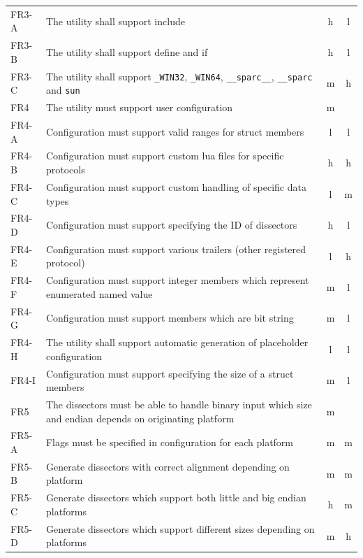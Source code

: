 \begin{table}[htbp]
{\begin{tabularx}{1.2\textwidth}{l X c c}
	FR3-A & The \gls{utility} shall support \gls{include} & \Gls{h} & \Gls{l} \\
	FR3-B & The \gls{utility} shall support \gls{define} and \gls{if} & \Gls{h} & \Gls{l} \\
	FR3-C & The \gls{utility} shall support \verb+_WIN32+, \verb+_WIN64+, \verb+__sparc__+, \verb+__sparc+ and \verb+sun+ & \Gls{m} & \Gls{h} \\
	\midrule
	FR4 & The \gls{utility} must support user configuration & \Gls{m} & \\
	FR4-A & Configuration must support valid ranges for \gls{struct} \glspl{member} & \Gls{l} & \Gls{l} \\
	FR4-B & Configuration must support custom \Gls{lua} files for specific \glspl{protocol} & \Gls{h} & \Gls{h} \\
	FR4-C & Configuration must support custom handling of specific data types & \Gls{l} & \Gls{m} \\
	FR4-D & Configuration must support specifying the ID of \glspl{dissector} & \Gls{h} & \Gls{l} \\
	FR4-E & Configuration must support various trailers (other registered \gls{protocol}) & \Gls{l} & \Gls{h} \\
	FR4-F & Configuration must support integer \glspl{member} which represent enumerated named value & \Gls{m} & \Gls{l} \\	
	FR4-G & Configuration must support \glspl{member} which are \gls{bit string} & \Gls{m} & \Gls{l} \\
	FR4-H & The utility shall support automatic generation of placeholder configuration & \Gls{l} & \Gls{l} \\
	FR4-I & Configuration must support specifying the size of a struct members & \Gls{m} & \Gls{l} \\
	\midrule
	FR5 & The \glspl{dissector} must be able to handle \gls{binary} input which size and \gls{endian} depends on originating platform & \Gls{m} & \\
	FR5-A & Flags must be specified in configuration for each platform & \Gls{m} & \Gls{m} \\
	FR5-B & Generate \glspl{dissector} with correct alignment depending on platform & \Gls{m} & \Gls{m} \\
	FR5-C & Generate \glspl{dissector} which support both little and big \gls{endian} platforms & \Gls{h} & \Gls{m} \\
	FR5-D & Generate \glspl{dissector} which support different sizes depending on platforms & \Gls{m} & \Gls{h} \\

\end{tabularx}}
\end{table}
